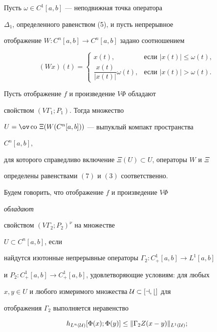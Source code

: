 Пусть $\omega\in C^1[a,b]$ --- неподвижная точка оператора


$\Delta_1$, определенного равенством (5), и пусть непрерывное


отображение $W:C^n[a,b]\to C^n[a,b]$ задано соотношением


\begin{equation}


(Wx)(t)=


\begin{cases}


x(t),& \text{если }|x(t)|\le\omega(t),\\


\dfrac{x(t)}{|x(t)|}\omega(t),


& \text{если }|x(t)|>\omega(t).


\end{cases}


\end{equation}





\begin{lem} Пусть отображение $f$ и произведение $V\Phi$ обладают


свойством $(V\Gamma_1;P_1)$. Тогда множество


$U=\ov\co\, \Xi(W(C^n[a,b]))$ --- выпуклый компакт пространства


$C^n[a,b]$,


для которого справедливо включение $\Xi(U)\subset U$, операторы $W$ и $\Xi$


определены равенствами $(7)$ и $(3)$ соответственно.


\end{lem}





Будем говорить, что отображение $f$ и произведение $V\Phi$ {\it обладают


свойством $(V\Gamma_2 ;P_2)^\nu$ на множестве}


$U\subset C^n[a,b]$, если


найдутся изотонные непрерывные операторы $\Gamma_2:C^1_+[a,b]\to L^1[a,b]$


и $P_2:C^1_+[a,b]\to C^1_+[a,b]$, удовлетворяющие условиям: для любых


$x,y\in U$ и любого измеримого множества $\cal U\subset[a,b]$ для


отображения ${\Gamma_2}$ выполняется неравенство


\begin{equation}


h_{L^n(\cal U)}[\Phi(x);\Phi(y)]\le \|\Gamma_2 Z(x-y)\|_{L^1(\cal U)};


\end{equation}


